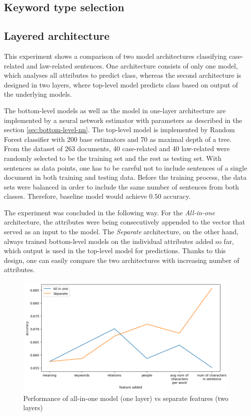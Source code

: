 \documentclass[
  digital, %
  notable,   %
  nolof,     %
  nolot,     %
  draft
]{fithesis3}
\begin{document}
\subsection{Keyword type selection}

\subsection{Layered architecture}
\label{eval:allinone-vs-features}
This experiment shows a comparison of two model architectures classifying case-related and law-related sentences.
One architecture consists of only one model, which analyses all attributes to predict class, whereas the second architecture is designed in two layers, where top-level model predicts class based on output of the underlying models.

The bottom-level models as well as the model in one-layer architecture are implemented by a neural network estimator with parameters as described in the section \ref{sec:bottom-level-nn}.
The top-level model is implemented by Random Forest classifier with 200 base estimators and 70 as maximal depth of a tree.
From the dataset of 263 documents, 40 case-related and 40 law-related were randomly selected to be the training set and the rest as testing set.
With sentences as data points, one has to be careful not to include sentences of a single document in both training and testing data.
Before the training process, the data sets were balanced in order to include the same number of sentences from both classes.
Therefore, baseline model would achieve $0.50$ accuracy.

The experiment was concluded in the following way.
For the \textit{All-in-one} architecture, the attributes were being consecutively appended to the vector that served as an input to the model.
The \textit{Separate} architecture, on the other hand, always trained bottom-level models on the individual attributes added so far, which output is used in the top-level model for predictions.
Thanks to this design, one can easily compare the two architectures with increasing number of attributes.

\begin{figure}[H]
\caption{Performance of all-in-one model (one layer) vs separate features (two layers)}
\label{fig:eval_all-in-one}
\includegraphics[width=\textwidth]{img/eval_all-in-one}
\end{figure}
\end{document}
